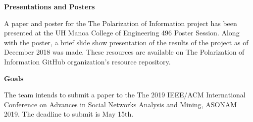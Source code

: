 \documentclass{article}
\begin{document}
\vspace{0.5cm}

\par \noindent \textbf{Presentations and Posters}

\par A paper and poster for the The Polarization of Information project has been presented at the UH Manoa College of Engineering 496 Poster Session. Along with the poster, a brief slide show presentation of the results of the project as of December 2018 was made. These resources are available on The Polarization of Information GitHub organization's resource repository. 

\par \noindent \textbf{Goals}

\par The team intends to submit a paper to the The 2019 IEEE/ACM International Conference on Advances in Social Networks Analysis and Mining, ASONAM 2019. The deadline to submit is May 15th. 
\end{document}
